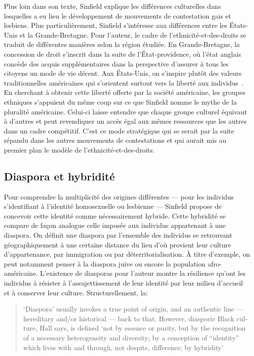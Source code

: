 Plus loin dans son texte, Sinfield explique les différences culturelles dans lesquelles a eu lieu le développement de mouvements de contestation gais et lesbiens.
Plus particulièrement, Sinfield s'intéresse aux différences entre les États-Unis et la Grande-Bretagne.
Pour l'auteur, le cadre de l'ethnicité-et-des-droits se traduit de différentes manières selon la région étudiée.
En Grande-Bretagne, la concession de droit s'inscrit dans la suite de l'État-providence, où l'état anglais concède des acquis supplémentaires dans la perspective d'assurer à tous les citoyens un mode de vie décent.
Aux États-Unis, on s'inspire plutôt des valeurs traditionnelles américaines qui s'orientent surtout vers la liberté aux individus~\citep[274]{Sinfield1996}.
En cherchant à obtenir cette liberté offerte par la société américaine, les groupes ethniques s'appuient du même coup sur ce que Sinfield nomme le mythe de la pluralité américaine.
Celui-ci laisse entendre que chaque groupe culturel équivaut à d'autres et peut revendiquer un accès égal aux mêmes ressources que les autres dans un cadre compétitif.
C'est ce mode stratégique qui se serait par la suite répandu dans les autres mouvements de contestations et qui aurait  mis au premier plan le modèle de l'ethnicité-et-des-droits.

\subsection{Diaspora et hybridité}
\label{sub:diaspora_et_hybridit_} Pour comprendre la multiplicité des origines différentes --- pour les individus s'identifiant à l'identité homosexuelle ou lesbienne --- Sinfield propose de concevoir cette identité comme nécessairement hybride.
Cette hybridité se compare de façon analogue celle imposée aux individus appartenant à une diaspora.
On définit une diaspora par l'ensemble des individus se retrouvant géographiquement à une certaine distance du lieu d'où provient leur culture d'appartenance, par immigration ou par déterritorialisation.
À titre d'exemple, on peut notamment penser à la diaspora juive ou encore la population afro-américaine.
L'existence de diasporas pour l'auteur montre la résilience qu'ont les individus à résister à l'assujettissement de leur identité par leur milieu d'accueil et à conserver leur culture.
Structurellement, la: \foreignblockquote{english}[{\cite[278]{Sinfield1996}}][.]{`Diaspora' \textelp{} usually invokes a true point of origin, and an authentic line --- hereditary and/or historical --- back to that. However, diasporic Black culture, Hall says, is defined `not by essence or purity, but by the recognition of a necessary heterogeneity and diversity; by a conception of ``identity'' which lives with and through, not despite, difference; by hybridity'}

